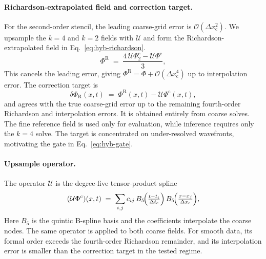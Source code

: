 \paragraph{Richardson-extrapolated field and correction target.} For the second-order
stencil, the leading coarse-grid error is
$\mathcal{O}(\Delta x_{\mathrm{c}}^2)$. We upsample the $k=4$ and
$k=2$ fields with $\mathcal{U}$ and form the Richardson-extrapolated field in
Eq.~\eqref{eq:hyb-richardson}.
\begin{equation}
  \Phi^{\mathrm{R}}
  \;=\; \frac{4\,\mathcal{U}\Phi^{\mathrm{c}}_{2}
              - \mathcal{U}\Phi^{\mathrm{c}}}{3},
  \label{eq:hyb-richardson}
\end{equation}
This cancels the leading error, giving
$\Phi^{\mathrm{R}}=\Phi+\mathcal{O}(\Delta x_{\mathrm{c}}^4)$ up to
interpolation error. The correction target is
\begin{equation}
  \delta\Phi_{\mathrm{R}}(x, t)
  \;=\; \Phi^{\mathrm{R}}(x, t) - \mathcal{U}\Phi^{\mathrm{c}}(x, t),
  \label{eq:hyb-residual}
\end{equation}
and agrees with the true coarse-grid error up to the remaining
fourth-order Richardson and interpolation errors. It is obtained
entirely from coarse solves. The fine reference field is used only for
evaluation, while inference requires only the $k=4$ solve. The target
is concentrated on under-resolved wavefronts, motivating the gate in
Eq.~\eqref{eq:hyb-gate}.

\paragraph{Upsample operator.} The operator $\mathcal{U}$ is the
degree-five tensor-product spline
\begin{equation}
  (\mathcal{U}\Phi^{\mathrm{c}})(x, t)
  \;=\; \sum_{i, j} c_{ij}\,
        B_{5}\!\Bigl(\tfrac{t - t_{i}}{\Delta t_{\mathrm{c}}}\Bigr)\,
        B_{5}\!\Bigl(\tfrac{x - x_{j}}{\Delta x_{\mathrm{c}}}\Bigr),
  \label{eq:hyb-upsample}
\end{equation}
Here $B_5$ is the quintic B-spline basis and the coefficients
interpolate the coarse nodes. The same operator is applied to both
coarse fields. For smooth data, its formal order exceeds the
fourth-order Richardson remainder, and its interpolation error is
smaller than the correction target in the tested regime.

